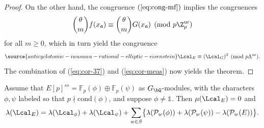\begin{proof}
On the other hand, the congruence $(\ref{eq:cong-mf})$ implies the congruences
\[
\binom{\theta}{m}f(x_{\mathfrak{a}})\equiv
\binom{\theta}{m}G(x_{\mathfrak{a}})\pmod{p\Z_p^{\rm ur}}
\]
for all $m\geqslant 0$, which in turn yield the congruence
\begin{equation}\label{eq:cor-meas}
\source{anticyclotomic-iwasawa-rational-elliptic-eisenstein}
\Lcal_E\equiv(\Lcal_G)^2\pmod{p\Lambda^{\rm ur}}.
\end{equation}
The combination of (\ref{eq:cor-37}) and (\ref{eq:cor-meas}) now yields the theorem.
\end{proof}


\begin{theorem}
\notready\label{cor:Kriz}
Assume that $E[p]^{ss}=\mathbb{F}_p(\phi)\oplus\mathbb{F}_p(\psi)$ as $G_\bQ$-modules, with the characters $\phi, \psi$ labeled so that $p\nmid\mathrm{cond}(\phi)$, and suppose $\phi\neq\mathds{1}$. Then $\mu(\Lcal_E)=0$ and
\[
\lambda(\Lcal_E)=\lambda(\Lcal_\phi)+\lambda(\Lcal_\psi)+\sum_{w\in S}\bigl\{\lambda(\mathcal{P}_w(\phi))+\lambda(\mathcal{P}_w(\psi))-\lambda(\mathcal{P}_w(E))\bigr\}.
\]
\end{theorem}


